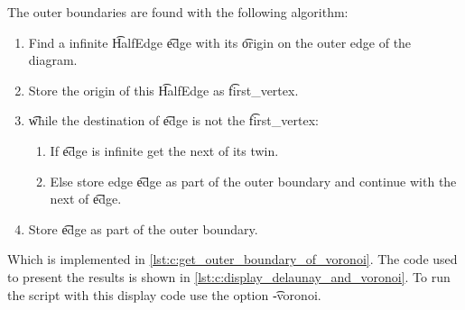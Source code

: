 The outer boundaries are found with the following algorithm:
	\begin{enumerate}
		\item Find a infinite \t{HalfEdge} \t{edge} with its \t{origin} on the outer edge of the diagram.
		\item Store the origin of this \t{HalfEdge} as \t{first_vertex}.
		\item \t{while} the destination of \t{edge} is not the \t{first_vertex}:
			\begin{enumerate}
				\item If \t{edge} is infinite get the next of its twin.
				\item Else store edge \t{edge} as part of the outer boundary and continue with the next of \t{edge}.
			\end{enumerate}
		\item Store \t{edge} as part of the outer boundary.
	\end{enumerate}

Which is implemented in \autoref{lst:c:get_outer_boundary_of_voronoi}. The code used to present the results is shown in \autoref{lst:c:display_delaunay_and_voronoi}. To run the script with this display code use the option \t{-voronoi}.





